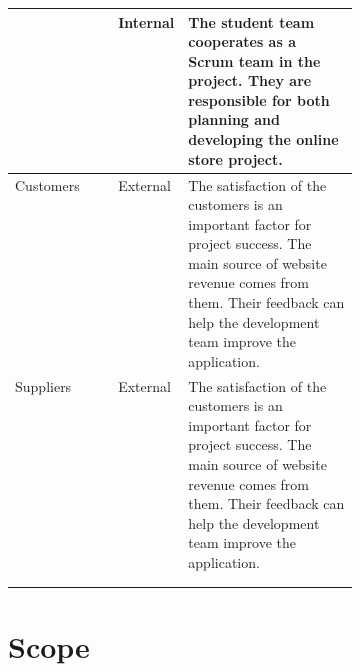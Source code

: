\documentclass{report}
\begin{document}
\begin{tabularx}{0.95\linewidth}{%
  >{\raggedright\arraybackslash}p{0.3\linewidth}%
  >{\raggedright\arraybackslash}p{0.1\linewidth}%
  >{\raggedright\arraybackslash}X}
  & Internal
  & The student team cooperates as a Scrum team in the project. They are responsible for both planning and developing the online store project. 
  \\
  \midrule
  Customers
  & External
  & The satisfaction of the customers is an important factor for project success. The main source of website revenue comes from them. Their feedback can help the development team improve the application.
  \\
  \midrule
  Suppliers
  & External
  & The satisfaction of the customers is an important factor for project success. The main source of website revenue comes from them. Their feedback can help the development team improve the application.
  \\
  \bottomrule
  \\
  \caption{Stakeholder Register}  
  \label{tab:stakeholderRegister}
\end{tabularx}

\section{Scope}
\label{sec:scope}
\end{document}

